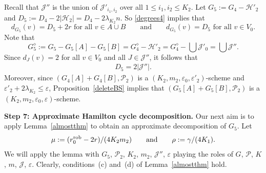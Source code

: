 \documentclass{memo-l}
\def\cP{\mathcal{P}}
\def\eps{\varepsilon}
\def\cJ{\mathcal{J}}
\numberwithin{section}{chapter}
\numberwithin{equation}{section}
\numberwithin{firstthm}{section}
\numberwithin{figure}{section}
\begin{document}
{Recall that $\cJ''$ is the union of $\mathcal{J}'_{i_1, i_2}$ over all $1 \le i_1, i_2  \le K_2$.
Let $G_5:=G_4-\mathcal{H}'_2$ and $D_5:=D_4-2|\mathcal{H}_2| = D_4 - 2 \lambda_{K_2} n $.
So \eqref{degrees4} implies that
\begin{equation} \label{degrees5}
d_{G_5}(v)=D_5+2r \mbox{ for all } v \in A \cup B \qquad \mbox{and} \qquad d_{G_5}(v)=D_5 \mbox{ for all } v \in V_0.
\end{equation}
Note that 
\begin{equation} \label{G5diam}
G^{\diamond}_5 := G_5 - G_5[A] - G_5[B] = G_4^{\diamond} - \mathcal{H}'_2 = G_4^{\diamond} - \bigcup \mathcal{J}'_0=\bigcup \cJ''.
\end{equation}
Since $d_J(v) =2$ for all $v \in V_0$ and all $J \in \mathcal{J}''$, it follows that
\begin{align}
D_5 = 2 |\cJ''|. \label{eq:D5}
\end{align}
Moreover, since  $(G_4[A] +G_4[B], \mathcal{P}_2)$ is a $(K_2, m _2, \eps_0, \eps'_2)$-scheme and $\eps'_2 + 2\lambda_{K_2} \le \eps$,
Proposition~\ref{deleteBS} implies that $(G_5[A] +G_5[B], \mathcal{P}_2)$ is a $(K_2, m _2, \eps_0, \eps)$-scheme.

\smallskip


\noindent\textbf{Step 7: Approximate Hamilton cycle decomposition.}
Our next aim is to apply Lemma~\ref{almostthm} to obtain an approximate decomposition of $G_5$. 
Let 
\begin{align*}
\mu:=(r^{\rm rob}_0-2r)/(4K_2m_2) \qquad \text{and} \qquad \rho := \gamma/(4 K_1).
\end{align*}
We will apply the lemma with $G_5$, $\cP_2$, $K_2$, $m_2$, $\cJ''$, $\eps$ playing the roles of $G$, $\cP$, $K$, $m$, $\cJ$, $\eps$.
Clearly, conditions~(c) and~(d) of Lemma~\ref{almostthm} hold.

}
\end{document}
